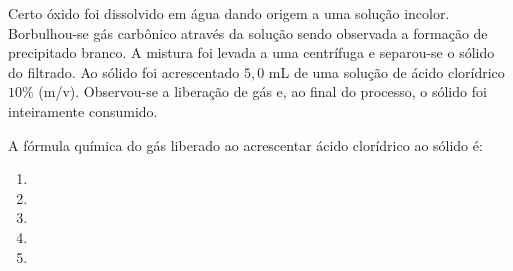 Certo óxido foi dissolvido em água dando origem a uma solução incolor. Borbulhou-se gás carbônico através da solução sendo observada a formação de precipitado branco.
A mistura foi levada a uma centrífuga e separou-se o sólido do filtrado.
Ao sólido foi acrescentado $5,0$ mL de uma solução de ácido clorídrico $10\%$ (m/v).
Observou-se a liberação de gás e, ao final do processo, o sólido foi inteiramente consumido.

A fórmula química do gás liberado ao acrescentar ácido clorídrico ao sólido é:

\begin{enumerate}[label = (\alph*), itemjoin={\qquad}]
	\item {}
	\item {}
	\item {}
	\item {}
	\item {}
\end{enumerate}
